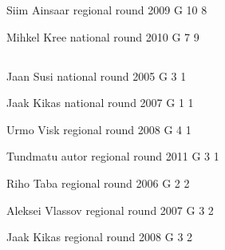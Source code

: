 \documentclass[11pt]{article}
\begin{document}
\ylDisplay{} %
{Siim Ainsaar} %
{regional round} %
{2009} %
{G 10} %
{8} %
{

\ifEngStatement
\fi
}

\ylDisplay{} %
{Mihkel Kree} %
{national round} %
{2010} %
{G 7} %
{9} %
{

\ifEngStatement
\fi
}
\newpage\subsection{\protect{}}

\ylDisplay{} %
{Jaan Susi} %
{national round} %
{2005} %
{G 3} %
{1} %
{

\ifEngStatement
\fi
}

\ylDisplay{} %
{Jaak Kikas} %
{national round} %
{2007} %
{G 1} %
{1} %
{

\ifEngStatement
\fi
}

\ylDisplay{} %
{Urmo Visk} %
{regional round} %
{2008} %
{G 4} %
{1} %
{

\ifEngStatement
\fi
}

\ylDisplay{} %
{Tundmatu autor} %
{regional round} %
{2011} %
{G 3} %
{1} %
{

\ifEngStatement
\fi
}

\ylDisplay{} %
{Riho Taba} %
{regional round} %
{2006} %
{G 2} %
{2} %
{

\ifEngStatement
\fi
}

\ylDisplay{} %
{Aleksei Vlassov} %
{regional round} %
{2007} %
{G 3} %
{2} %
{

\ifEngStatement
\fi
}

\ylDisplay{} %
{Jaak Kikas} %
{regional round} %
{2008} %
{G 3} %
{2} %
{

\ifEngStatement
\fi
}
\end{document}
